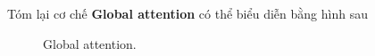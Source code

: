 Tóm lại cơ chế \textbf{Global attention} có thể biểu diễn bằng hình sau
\begin{figure}[!htb]
    \caption{\label{fig:global-attention} Global attention.}
\end{figure}